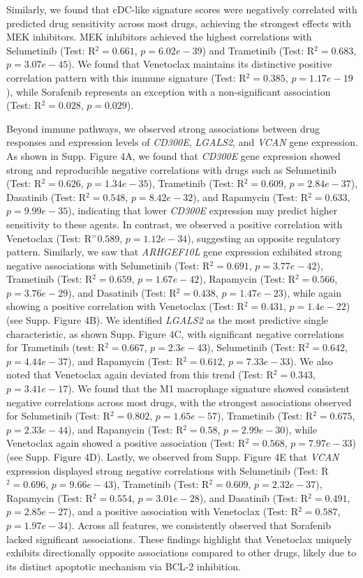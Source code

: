 \documentclass[pdflatex,sn-mathphys-num]{sn-jnl}%
\theoremstyle{thmstyleone}%
\theoremstyle{thmstyletwo}%
\theoremstyle{thmstylethree}%
\begin{document}
Similarly, we found that cDC-like signature scores were negatively correlated with predicted drug sensitivity across most drugs, achieving the strongest effects with MEK inhibitors. 
MEK inhibitors achieved the highest correlations with Selumetinib (Test: R$^2=0.661$, $p=6.02e-39$) and Trametinib (Test: R$^2=0.683$, $p=3.07e-45$). 
We found that Venetoclax maintains its distinctive positive correlation pattern with this immune signature (Test: R$^2=0.385$, $p=1.17e-19$), while Sorafenib represents an exception with a non-significant association (Test: R$^2=0.028$, $p=0.029$). 

Beyond immune pathways, we observed strong associations between drug responses and expression levels of \textit{CD300E}, \textit{LGALS2}, and \textit{VCAN} gene expression. As shown in Supp. Figure 4A, we found that \textit{CD300E} gene expression showed strong and reproducible negative correlations with drugs such as Selumetinib (Test: R$^2 = 0.626$, $p = 1.34e-35$), Trametinib (Test: R$^2 = 0.609$, $p = 2.84e-37$), Dasatinib (Test: R$^2 = 0.548$, $p = 8.42e-32$), and Rapamycin (Test: R$^2 = 0.633$, $p = 9.99e-35$), indicating that lower \textit{CD300E} expression may predict higher sensitivity to these agents. In contrast, we observed a positive correlation with Venetoclax (Test: R$^ = 0.589$, $p = 1.12e-34$), suggesting an opposite regulatory pattern. Similarly, we saw that \textit{ARHGEF10L} gene expression exhibited strong negative associations with Selumetinib (Test: R$^2 = 0.691$, $p = 3.77e-42$), Trametinib (Test: R$^2 = 0.659$, $p = 1.67e-42$), Rapamycin (Test: R$^2 = 0.566$, $p = 3.76e-29$), and Dasatinib (Test: R$^2 = 0.438$, $p = 1.47e-23$), while again showing a positive correlation with Venetoclax (Test: R$^2 = 0.431$, $p = 1.4e-22$) (see Supp. Figure 4B). We identified \textit{LGALS2} as the most predictive single characteristic, as shown Supp. Figure 4C, with significant negative correlations for Trametinib (test: R$^2 = 0.667$, $p = 2.3e-43$), Selumetinib (Test: R$^2 = 0.642$, $p = 4.44e-37$), and Rapamycin (Test: R$^2 = 0.612$, $p = 7.33e-33$). We also noted that Venetoclax again deviated from this trend (Test: R$^2 = 0.343$, $p = 3.41e-17$). We found that the M1 macrophage signature showed consistent negative correlations across most drugs, with the strongest associations observed for Selumetinib (Test: R$^2 = 0.802$, $p = 1.65e-57$), Trametinib (Test: R$^2 = 0.675$, $p = 2.33e-44$), and Rapamycin (Test: R$^2 = 0.58$, $p = 2.99e-30$), while Venetoclax again showed a positive association (Test: R$^2 = 0.568$, $p = 7.97e-33$) (see Supp. Figure 4D). Lastly, we observed from Supp. Figure 4E that \textit{VCAN} expression displayed strong negative correlations with Selumetinib (Test: R$^2 = 0.696$, $p = 9.66e-43$), Trametinib (Test: R$^2 = 0.609$, $p = 2.32e-37$), Rapamycin (Test: R$^2 = 0.554$, $p = 3.01e-28$), and Dasatinib (Test: R$^2 = 0.491$, $p = 2.85e-27$), and a positive association with Venetoclax (Test: R$^2 = 0.587$, $p = 1.97e-34$). Across all features, we consistently observed that Sorafenib lacked significant associations. These findings highlight that Venetoclax uniquely exhibits directionally opposite associations compared to other drugs, likely due to its distinct apoptotic mechanism via BCL-2 inhibition.
\end{document}
